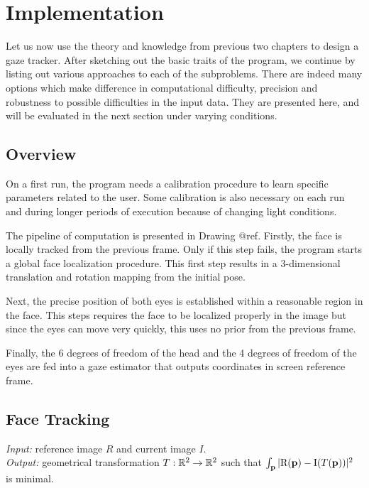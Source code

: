 \chapter{Implementation}

Let us now use the theory and knowledge from previous two chapters to design a gaze tracker.
After sketching out the basic traits of the program, we continue by listing out various approaches to each of the subproblems.
There are indeed many options which make difference in computational difficulty, precision and robustness to possible difficulties in the input data.
They are presented here, and will be evaluated in the next section under varying conditions.

\section{Overview}

On a first run, the program needs a calibration procedure to learn specific parameters related to the user.
Some calibration is also necessary on each run and during longer periods of execution because of changing light conditions.

The pipeline of computation is presented in Drawing @ref.
Firstly, the face is locally tracked from the previous frame.
Only if this step fails, the program starts a global face localization procedure.
This first step results in a 3-dimensional translation and rotation mapping from the initial pose.

Next, the precise position of both eyes is established within a reasonable region in the face.
This steps requires the face to be localized properly in the image but since the eyes can move very quickly, this uses no prior from the previous frame.

Finally, the 6 degrees of freedom of the head and the 4 degrees of freedom of the eyes are fed into a gaze estimator that outputs coordinates in screen reference frame.

\section{Face Tracking}

\textit{Input:} reference image $R$ and current image $I$.\\
\textit{Output:} geometrical transformation $T: \mathbb{R}^2 \to \mathbb{R}^2$ such that $\int_{\mathbf{p}} |\textrm{R}(\mathbf{p}) - \textrm{I}(T(\mathbf{p}))|^2$ is minimal.\\

